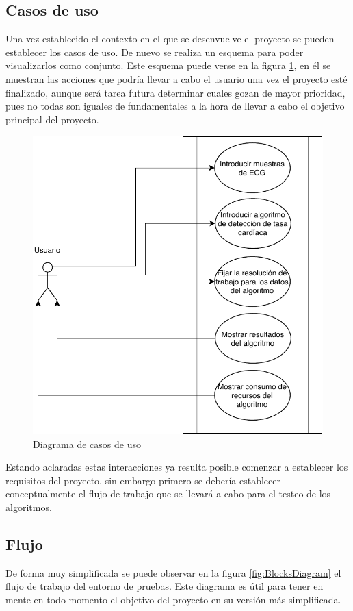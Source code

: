     \subsection{Casos de uso}

    Una vez establecido el contexto en el que se desenvuelve el proyecto se pueden establecer los casos de uso. De nuevo se realiza un esquema para poder visualizarlos como conjunto. Este esquema puede verse en la figura \ref{fig:UseCasesDiagram}, en él se muestran las acciones que podría llevar a cabo el usuario una vez el proyecto esté finalizado, aunque será tarea futura determinar cuales gozan de mayor prioridad, pues no todas son iguales de fundamentales a la hora de llevar a cabo el objetivo principal del proyecto.

    \begin{figure}[H]  
        \centering
            \includegraphics[width =0.7\linewidth]{figuras/UseCasesDiagram.pdf}
        \caption{Diagrama de casos de uso}
        \label{fig:UseCasesDiagram}
    \end{figure}

    Estando aclaradas estas interacciones ya resulta posible comenzar a establecer los requisitos del proyecto, sin embargo primero se debería establecer conceptualmente el flujo de trabajo que se llevará a cabo para el testeo de los algoritmos.

    \subsection{Flujo}

    De forma muy simplificada se puede observar en la figura \ref{fig:BlocksDiagram} el flujo de trabajo del entorno de pruebas. Este diagrama es útil para tener en mente en todo momento el objetivo del proyecto en su versión más simplificada.

